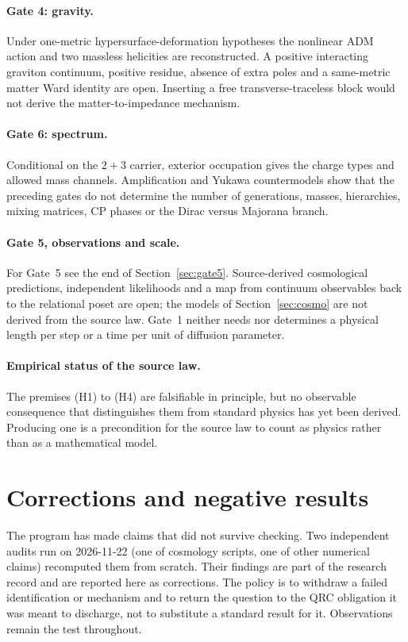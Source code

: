 \documentclass[11pt]{article}
\theoremstyle{definition}
\theoremstyle{remark}
\begin{document}
\paragraph{Gate 4: gravity.} Under one-metric hypersurface-deformation hypotheses the
nonlinear ADM action and two massless helicities are reconstructed. A positive
interacting graviton continuum, positive residue, absence of extra poles and a
same-metric matter Ward identity are open. Inserting a free transverse-traceless block
would not derive the matter-to-impedance mechanism.

\paragraph{Gate 6: spectrum.} Conditional on the $2+3$ carrier, exterior occupation
gives the charge types and allowed mass channels. Amplification and Yukawa countermodels
show that the preceding gates do not determine the number of generations, masses,
hierarchies, mixing matrices, CP phases or the Dirac versus Majorana branch.

\paragraph{Gate 5, observations and scale.} For Gate~5 see the end of
Section~\ref{sec:gate5}. Source-derived cosmological predictions, independent likelihoods
and a map from continuum observables back to the relational poset are open; the models of
Section~\ref{sec:cosmo} are not derived from the source law. Gate~1 neither needs nor
determines a physical length per step or a time per unit of diffusion parameter.

\paragraph{Empirical status of the source law.} The premises (H1) to (H4) are
falsifiable in principle, but no observable consequence that distinguishes them from
standard physics has yet been derived. Producing one is a precondition for the source
law to count as physics rather than as a mathematical model.

\section{Corrections and negative results}
\label{sec:corrections}

The program has made claims that did not survive checking. Two independent audits run on
2026-11-22 (one of cosmology scripts, one of other numerical claims) recomputed them
from scratch. Their findings are part of the research record and are reported here as
corrections. The policy is to withdraw a failed identification or mechanism and to
return the question to the QRC obligation it was meant to discharge, not to substitute a
standard result for it. Observations remain the test throughout.
\end{document}
